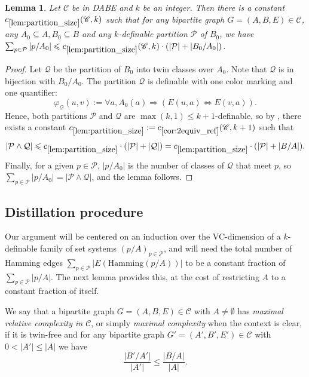 \documentclass[11pt]{article}
\newtheorem{lemma}[theorem]{Lemma}
\theoremstyle{definition}
\newcommand{\CC}{{\mathscr C}}
\renewcommand{\leq}{\leqslant}
\renewcommand{\le}{\leqslant}
\newcommand{\Pp}{\mathcal{P}}
\newcommand{\Qq}{\mathcal{Q}}
\newcommand{\remph}[1]{{\color{red} \emph{#1}}}
\newcommand{\hamming}{\mathrm{Hamming}}
\begin{document}
\begin{lemma}\label{lem:partition_size}
Let $\CC$ be in DABE and $k$ be an integer. Then there is a constant $c_{\ref{lem:partition_size}}(\CC, k) $ such that
for any bipartite graph $G = (A, B, E) \in \CC$, any $A_0 \subseteq A, B_0 \subseteq B$ and any $k$-definable partition $\Pp$ of $B_0$, we have $\sum_{p \in \Pp} |p/A_0| \leq c_{\ref{lem:partition_size}}(\CC, k) \cdot (|\Pp| + |B_0/A_0|)$.
\end{lemma}
\begin{proof}
Let $\Qq$ be the partition of $B_0$ into twin classes over $A_0$. Note that $\Qq$ is in bijection with $B_0/A_0$.
The partition $\Qq$ is definable with one color marking and one quantifier:
\[
\varphi_{\Qq} (u, v) := \forall a, A_0(a) \Rightarrow \left( E(u, a) \Leftrightarrow E(v, a) \right).
\]
Hence, both partitions $\Pp$ and $\Qq$ are $\max(k, 1) \le k+1$-definable, so by , there exists a constant $c_{\ref{lem:partition_size}} := c_{\ref{cor:2equiv_ref}} (\CC, k+1)$ such that 
\[
|\Pp \wedge \Qq| \leqslant c_{\ref{lem:partition_size}} \cdot (|\Pp| + |\Qq|) = c_{\ref{lem:partition_size}} \cdot (|\Pp| + |B/A|).
\]
Finally, for a given $p \in \Pp$, $|p/A_0|$ is the number of classes of $\Qq$ that meet $p$, so $\sum_{p \in \Pp} |p/A_0| = |\Pp \wedge \Qq|$, and the lemma follows.
\end{proof}


\subsection{Distillation procedure}
Our argument will be centered on an induction over the VC-dimension of a $k$-definable family of set systems $(p/A)_{p \in \Pp}$, and will need the total number of Hamming edges $\sum_{p \in \Pp} |E(\hamming(p/A))|$ to be a constant fraction of $\sum_{p \in \Pp} |p/A|$. The next lemma provides this, at the cost of restricting $A$ to a constant fraction of itself.

We say that a bipartite graph $G = (A, B, E) \in \CC$ with $A \neq \emptyset$ has \remph{maximal relative complexity in $\CC$}, or simply \remph{maximal complexity} when the context is clear, if it is twin-free and for any bipartite graph $G' = (A', B', E') \in \CC$ with $0 < |A'| \leq |A|$ we have
\[
\frac{|B'/A'|}{|A'|} \leq \frac{|B/A|}{|A|}.
\]
\end{document}
